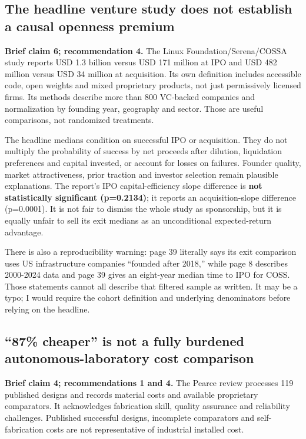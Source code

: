 \subsection{The headline venture study does not establish a causal
openness
premium}\label{the-headline-venture-study-does-not-establish-a-causal-openness-premium}

\textbf{Brief claim 6; recommendation 4.} The Linux
Foundation/Serena/COSSA study reports USD 1.3 billion versus USD 171
million at IPO and USD 482 million versus USD 34 million at acquisition.
Its own definition includes accessible code, open weights and mixed
proprietary products, not just permissively licensed firms. Its methods
describe more than 800 VC-backed companies and normalization by founding
year, geography and sector. Those are useful comparisons, not randomized
treatments. \citep[pp.~8--9, 39--41]{Boysel2025State}

The headline medians condition on successful IPO or acquisition. They do
not multiply the probability of success by net proceeds after dilution,
liquidation preferences and capital invested, or account for losses on
failures. Founder quality, market attractiveness, prior traction and
investor selection remain plausible explanations. The report's IPO
capital-efficiency slope difference is \textbf{not statistically
significant (p=0.2134)}; it reports an acquisition-slope difference
(p=0.0001). It is not fair to dismiss the whole study as sponsorship,
but it is equally unfair to sell its exit medians as an unconditional
expected-return advantage.

There is also a reproducibility warning: page 39 literally says its exit
comparison uses US infrastructure companies ``founded after 2018,''
while page 8 describes 2000-2024 data and page 39 gives an eight-year
median time to IPO for COSS. Those statements cannot all describe that
filtered sample as written. It may be a typo; I would require the cohort
definition and underlying denominators before relying on the headline.
\citep{Boysel2025State}

\subsection{``87\% cheaper'' is not a fully burdened
autonomous-laboratory cost
comparison}\label{cheaper-is-not-a-fully-burdened-autonomous-laboratory-cost-comparison}

\textbf{Brief claim 4; recommendations 1 and 4.} The Pearce review
processes 119 published designs and records material costs and available
proprietary comparators. It acknowledges fabrication skill, quality
assurance and reliability challenges. \citep{Pearce2020} Published
successful designs, incomplete comparators and self-fabrication costs
are not representative of industrial installed cost.

